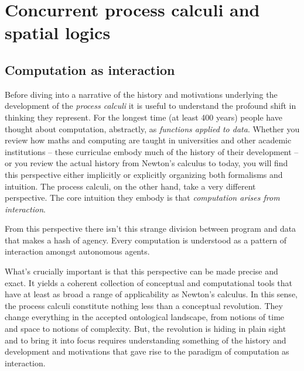 \section{Concurrent process calculi and spatial logics }\label{sec:concurrent_process_calculi_and_spatial_logics_} %

\subsection{Computation as interaction}
Before diving into a narrative of the history and motivations
underlying the development of the \emph{process calculi} it is useful
to understand the profound shift in thinking they represent. For the
longest time (at least 400 years) people have thought about
computation, abstractly, as \emph{functions applied to data}. Whether
you review how maths and computing are taught in universities and
other academic institutions -- these curriculae embody much of the
history of their development -- or you review the actual history from
Newton's calculus to today, you will find this perspective either
implicitly or explicitly organizing both formalisms and intuition. The
process calculi, on the other hand, take a very different
perspective. The core intuition they embody is that \emph{computation
  arises from interaction}.

From this perspective there isn't this strange division between
program and data that makes a hash of agency. Every computation is
understood as a pattern of interaction amongst autonomous agents.

What's crucially important is that this perspective can be made
precise and exact. It yields a coherent collection of conceptual and
computational tools that have at least as broad a range of
applicability as Newton's calculus. In this sense, the process calculi
constitute nothing less than a conceptual revolution. They change
everything in the accepted ontological landscape, from notions of time
and space to notions of complexity. But, the revolution is hiding in
plain sight and to bring it into focus requires understanding
something of the history and development and motivations that gave
rise to the paradigm of computation as interaction.


